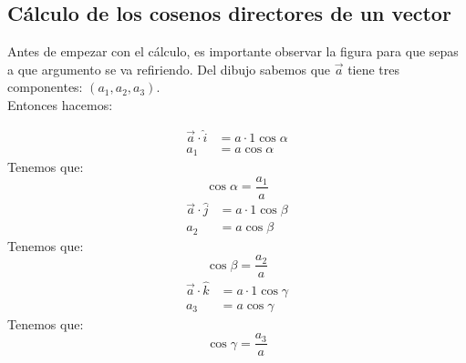 \documentclass[12pt,openany]{book}
\begin{document}
	    \subsection{C\'alculo de los cosenos directores de un vector}
	    Antes de empezar con el c\'alculo, es importante observar la figura para que sepas a que argumento
	    se va refiriendo.
	    Del dibujo sabemos que $\vec{a}$ tiene tres componentes: $(a_{1},a_{2},a_{3})$.\\
	    Entonces hacemos:
	    \begin{multicols}{3}
		    \columnseprulecolor{\color{black}}
		    \setlength{\columnseprule}{1pt}
	    	\begin{center}
		    \begin{equation*}
		    	\begin{split}
		   			 \vec{a}\cdot\hat{i}&=a\cdot1\cos\alpha\\
		   			 a_{1}&=a\cos\alpha
		    	\end{split}
		    \end{equation*}
		    Tenemos que:
		    $$\cos\alpha=\frac{a_{1}}{a}$$
		    \breakcolumn
		    \begin{equation*}
		    	\begin{split}
		   			 \vec{a}\cdot\hat{j}&=a\cdot1\cos\beta\\
		   			 a_{2}&=a\cos\beta
		    	\end{split}
		    \end{equation*} 
	   	    Tenemos que:
		    $$\cos\beta=\frac{a_{2}}{a}$$
		    \breakcolumn
		    \begin{equation*}
		    	\begin{split}
		   			 \vec{a}\cdot\hat{k}&=a\cdot1\cos\gamma\\
		   			 a_{3}&=a\cos\gamma
		    	\end{split}
		    \end{equation*} 
	   	    Tenemos que:
		    $$\cos\gamma=\frac{a_{3}}{a}$$
		    \end{center}
	    \end{multicols}
	  
\end{document}
